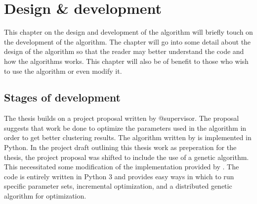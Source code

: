 
\chapter{Design \& development} %

\label{DesignDevelopment} %



This chapter on the design and development of the algorithm will briefly touch on the development of the algorithm. The chapter will go into some detail about the design of the algorithm so that the reader may better understand the code and how the algorithms works. This chapter will also be of benefit to those who wish to use the algorithm or even modify it.

\section{Stages of development}
The thesis builds on a project proposal written by @supervisor. The proposal suggests that work be done to optimize the parameters used in the \STC algorithm in order to get better clustering results. The \CTC algorithm written by \supervisor is implemented in Python. In the project draft outlining this thesis work as preperation for the thesis, the project proposal was shifted to include the use of a genetic algorithm. This necessitated some modification of the implementation provided by \supervisor. The code is entirely written in Python 3 and provides easy ways in which to run specific parameter sets, incremental optimization, and a distributed genetic algorithm for optimization.

